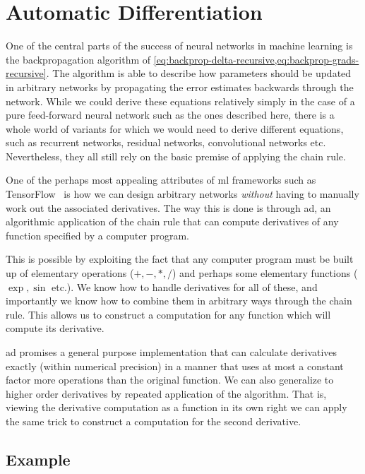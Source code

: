 \documentclass[Thesis.tex]{subfiles}
\begin{document}
\chapter{Automatic Differentiation}
\label{chp:auto-diff}

One of the central parts of the success of neural networks in machine learning
is the backpropagation algorithm of
\cref{eq:backprop-delta-recursive,eq:backprop-grads-recursive}. The algorithm is able to
describe how parameters should be updated in arbitrary networks by propagating
the error estimates backwards through the network. While we could derive these
equations relatively simply in the case of a pure feed-forward neural network
such as the ones described here, there is a whole world of variants for which
we would need to derive different equations, such as recurrent networks,
residual networks, convolutional networks etc. Nevertheless, they all still rely
on the basic premise of applying the chain rule.

One of the perhaps most appealing attributes of \gls{ml} frameworks such as TensorFlow~\cite{tensorflow2015-whitepaper}
is how we can design arbitrary networks \emph{without} having to manually work
out the associated derivatives. The way this is done is through \gls{ad}, an
algorithmic application of the chain rule that can compute derivatives of any
function specified by a computer program.

This is possible by exploiting the fact that any computer program must be built
up of elementary operations (\(+,-,*,/\)) and perhaps some elementary functions
(\(\exp, \sin\) etc.). We know how to handle derivatives for all of these, and
importantly we know how to combine them in arbitrary ways through the chain
rule. This allows us to construct a computation for any function which
will compute its derivative.

\Gls{ad} promises a general purpose implementation that can
calculate derivatives exactly (within numerical precision) in a manner that uses
at most a constant factor more operations than the original function. We can
also generalize to higher order derivatives by repeated application of the
algorithm. That is, viewing the derivative computation as a function in its own
right we can apply the same trick to construct a computation for the second
derivative.


\section{Example}
\end{document}
